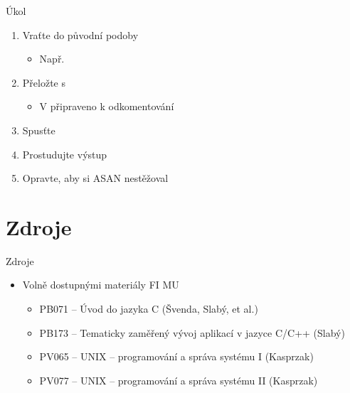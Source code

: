 \begin{frame}{Úkol}

  \begin{enumerate}
    \item Vraťte  do původní podoby
    \begin{itemize}
      \item Např.\ 
    \end{itemize}

    \item Přeložte  s 
    \begin{itemize}
      \item V  připraveno k odkomentování
    \end{itemize}

    \item Spusťte 
    \item Prostudujte výstup
    \item Opravte, aby si ASAN nestěžoval
  \end{enumerate}

\end{frame}

\section*{Zdroje}
\frame{\sectionpage}

\begin{frame}{Zdroje}

  \begin{itemize}
    \item Volně dostupnými materiály FI MU
    \begin{itemize}
      \item PB071 -- Úvod do jazyka C (Švenda, Slabý, et al.)
      \item PB173 -- Tematicky zaměřený vývoj aplikací v jazyce C/C++ (Slabý)
      \item PV065 -- UNIX -- programování a správa systému I (Kasprzak)
      \item PV077 -- UNIX -- programování a správa systému II (Kasprzak)
    \end{itemize}
  \end{itemize}

\end{frame}


